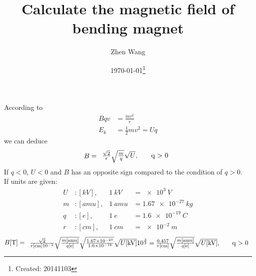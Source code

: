 \documentclass[letterpaper,11pt,pdftex]{article}
\title{Calculate the magnetic field of bending magnet }
\author{Zhen Wang}
\date{\today\footnote{Created: 20141103}}
\begin{document}
\maketitle

According to 
\begin{align}
    \label{eq:1}
    Bqv &= \frac{m{v}^{2}}{r} \\ 
    {E}_{k} &= \frac{1}{2}m{v}^{2 }= Uq             
\end{align}
we can deduce
\begin{align}
    B = \begin{array}{l l}
            \frac{\sqrt{2}}{r}\sqrt{\frac{m}{q}}\sqrt{U}, & \quad $q > 0$  
        \end{array}
\end{align}
If $q < 0$, $U < 0$ and $B$ has an opposite sign compared to the condition of $q > 0$. \\        
If units are given:
\begin{align}
    U &: [\si{kV}],  & \SI{1}{kV}  &= \SI{e3}{V} \\ 
    m &: [\si{amu}], & \SI{1}{amu} &= \SI{1.67e-27}{kg} \\ 
    q &: [\si{e}],   & \SI{1}{e}   &= \SI{1.6e-19}{C} \\ 
    r &: [\si{cm}],  & \SI{1}{cm}  &= \SI{e-2}{m}
\end{align}
\begin{align}
    B[\si{T}] = \begin{array}{l l}
                    \frac{\sqrt{2}}{r[\si{cm}]\SI{e-2}{}}\sqrt{\frac{m[\si{amu}]}{q[\si{e}]}}\sqrt{\frac{\SI{1.67e-27}{}}{\SI{1.6e-19}{}}}\sqrt{U[\si{kV}]}10^{\frac{3}{2}}  =  \frac{0.457}{r[\si{cm}]}\sqrt{\frac{m[\si{amu}]}{q[\si{e}]}}\sqrt{U[\si{kV}]},  & \quad $q > 0$ 
                \end{array}
\end{align}
\end{document}
